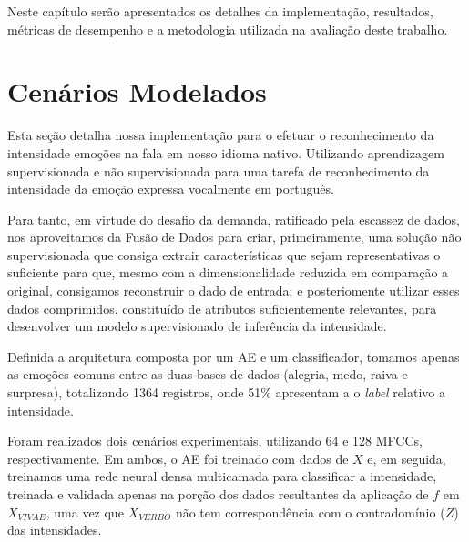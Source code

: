 \label{Cap:Resultados}

Neste capítulo serão apresentados os detalhes da implementação, resultados, métricas de desempenho e a metodologia utilizada na avaliação deste trabalho.\\

\section{Cenários Modelados}\label{sec:implementacao}

Esta seção detalha nossa implementação para o efetuar o reconhecimento da intensidade emoções na fala em nosso idioma nativo. Utilizando aprendizagem supervisionada e não supervisionada para uma tarefa de reconhecimento da intensidade da emoção expressa vocalmente em português.

Para tanto, em virtude do desafio da demanda, ratificado pela escassez de dados, nos aproveitamos da Fusão de Dados para criar, primeiramente, uma solução não supervisionada que consiga extrair características que sejam representativas o suficiente para que, mesmo com a dimensionalidade reduzida em comparação a original, consigamos reconstruir o dado de entrada; e posteriomente utilizar esses dados comprimidos, constituído de atributos suficientemente relevantes, para desenvolver um modelo supervisionado de inferência da intensidade.

Definida a arquitetura composta por um \acrlong{AE} e um classificador, tomamos apenas as emoções comuns entre as duas bases de dados (alegria, medo, raiva e surpresa), totalizando 1364 registros, onde 51\% apresentam a o \textit{label} relativo a intensidade. %


Foram realizados dois cenários experimentais, utilizando 64 e 128 \acrshort{MFCC}s, respectivamente. Em ambos, o \acrlong{AE} foi treinado com dados de $X$ e, em seguida, treinamos uma rede neural densa multicamada para classificar a intensidade, treinada e validada apenas na porção dos dados resultantes da aplicação de $f$ em $X_{VIVAE}$, uma vez que $X_{VERBO}$ não tem correspondência com o contradomínio ($Z$) das intensidades.

